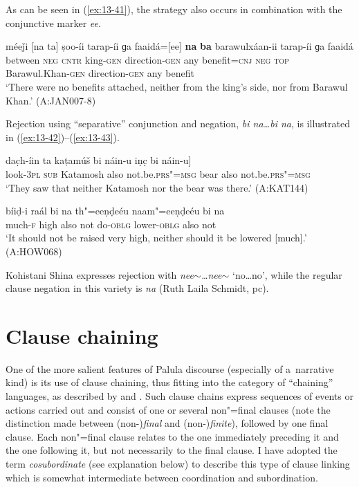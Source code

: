 As can be seen in (\ref{ex:13-41}), the strategy also occurs in combination with the conjunctive marker \textit{ee}.

\begin{exe}
\ex
\label{ex:13-41}
\gll méeǰi [na ta] ṣoo-íi tarap-íi ɡa faaidá=[ee] \textbf{na} \textbf{ba} barawulxáan-ii tarap-íi ɡa faaidá \\
between \textsc{neg} \textsc{cntr} king-\textsc{gen} direction-\textsc{gen} any benefit=\textsc{cnj} \textsc{neg} \textsc{top} Barawul.Khan-\textsc{gen} direction-\textsc{gen} any benefit  \\
\glt `There were no benefits attached, neither from the king's side, nor from Barawul Khan.' (A:JAN007-8) 
\end{exe}

Rejection using ``separative'' conjunction and negation, \textit{bi na{\ldots}bi na}, is illustrated in (\ref{ex:13-42})--(\ref{ex:13-43}).

\begin{exe}
\ex
\label{ex:13-42}
\gll dac̣h-íin ta kaṭamúš bi náin-u iṇc̣ bi náin-u] \\
look-\textsc{3pl} \textsc{sub} Katamosh also not.be.\textsc{prs"=msg} bear also not.be.\textsc{prs"=msg} \\
\glt `They saw that neither Katamosh nor the bear was there.' (A:KAT144)

\ex
\label{ex:13-43}
\gll bíiḍ-i raál bi na th"=eeṇḍeéu naam"=eeṇḍeéu bi na \\
much-\textsc{f} high also not do-\textsc{oblg} lower-\textsc{oblg} also not  \\
\glt `It should not be raised very high, neither should it be lowered [much].' (A:HOW068) 
\end{exe}

Kohistani Shina expresses rejection with \textit{nee$\sim${\ldots}nee$\sim$} `no{\ldots}no', while the regular clause negation in this variety is \textit{na} (Ruth Laila Schmidt, pc).


\section{Clause chaining}
\label{sec:13-3}

One of the more salient features of Palula discourse (especially of a~narrative kind) is its use of clause chaining, thus fitting into the category of ``chaining'' languages, as described by \citet[242]{thompsonetal2007} and \citet[374--376]{longacre2007}. Such clause chains express sequences of events or actions carried out and consist of one or several non"=final clauses (note the distinction made between (non-)\textit{final} and (non-)\textit{finite}), followed by one final clause. Each non"=final clause relates to the one immediately preceding it and the one following it, but not necessarily to the final clause. I have adopted the term \textit{cosubordinate} (see explanation below) to describe this type of clause linking which is somewhat intermediate between coordination and subordination.


